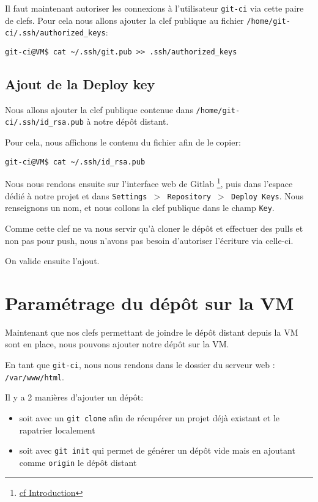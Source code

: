 Il faut maintenant autoriser les connexions à l'utilisateur \texttt{git-ci} via cette paire de clefs. Pour cela nous allons ajouter la clef publique au fichier \texttt{/home/git-ci/.ssh/authorized\_keys}:

    \begin{verbatim}
git-ci@VM$ cat ~/.ssh/git.pub >> .ssh/authorized_keys
    \end{verbatim}


\subsection{Ajout de la Deploy key}
Nous allons ajouter la clef publique contenue dans \texttt{/home/git-ci/.ssh/id\_rsa.pub} à notre dépôt distant.

Pour cela, nous affichons le contenu du fichier afin de le copier:

    \begin{verbatim}
git-ci@VM$ cat ~/.ssh/id_rsa.pub    
    \end{verbatim}

Nous nous rendons ensuite sur l'interface web de Gitlab \footnote{\hyperref[introduction]{cf Introduction}}, puis dans l'espace dédié à notre projet et dans \texttt{Settings $>$ Repository $>$ Deploy Keys}. Nous renseignons un nom, et nous collons la clef publique dans le champ \texttt{Key}. 

Comme cette clef ne va nous servir qu'à cloner le dépôt et effectuer des pulls et non pas pour push, nous n'avons pas besoin d'autoriser l'écriture via celle-ci.

On valide ensuite l'ajout.

\section{Paramétrage du dépôt sur la VM}

Maintenant que nos clefs permettant de joindre le dépôt distant depuis la VM sont en place, nous pouvons ajouter notre dépôt sur la VM.

En tant que \texttt{git-ci}, nous nous rendons dans le dossier du serveur web : \texttt{/var/www/html}.

Il y a 2 manières d'ajouter un dépôt:
\begin{itemize}
\item soit avec un \texttt{git clone} afin de récupérer un projet déjà existant et le rapatrier localement
\item soit avec \texttt{git init} qui permet de générer un dépôt vide mais en ajoutant comme \texttt{origin} le dépôt distant
\end{itemize}


